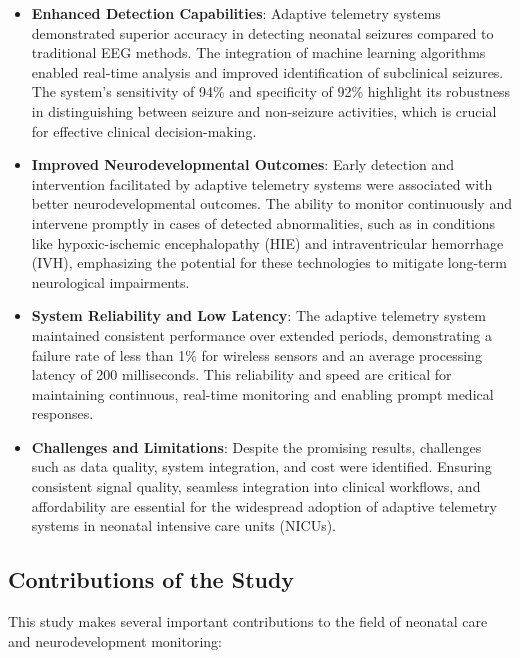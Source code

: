\documentclass[12pt,journal,compsoc]{IEEEtran}
\begin{document}
\begin{itemize}
    \item \textbf{Enhanced Detection Capabilities}: Adaptive telemetry systems demonstrated superior accuracy in detecting neonatal seizures compared to traditional EEG methods. The integration of machine learning algorithms enabled real-time analysis and improved identification of subclinical seizures. The system's sensitivity of 94\% and specificity of 92\% highlight its robustness in distinguishing between seizure and non-seizure activities, which is crucial for effective clinical decision-making.
    \item \textbf{Improved Neurodevelopmental Outcomes}: Early detection and intervention facilitated by adaptive telemetry systems were associated with better neurodevelopmental outcomes. The ability to monitor continuously and intervene promptly in cases of detected abnormalities, such as in conditions like hypoxic-ischemic encephalopathy (HIE) and intraventricular hemorrhage (IVH), emphasizing the potential for these technologies to mitigate long-term neurological impairments.
    \item \textbf{System Reliability and Low Latency}: The adaptive telemetry system maintained consistent performance over extended periods, demonstrating a failure rate of less than 1\% for wireless sensors and an average processing latency of 200 milliseconds. This reliability and speed are critical for maintaining continuous, real-time monitoring and enabling prompt medical responses.
    \item \textbf{Challenges and Limitations}: Despite the promising results, challenges such as data quality, system integration, and cost were identified. Ensuring consistent signal quality, seamless integration into clinical workflows, and affordability are essential for the widespread adoption of adaptive telemetry systems in neonatal intensive care units (NICUs).
\end{itemize}

\subsection{Contributions of the Study}

This study makes several important contributions to the field of neonatal care and neurodevelopment monitoring:
\end{document}
